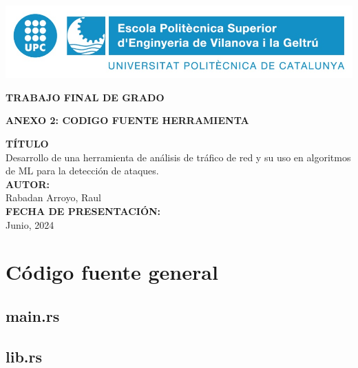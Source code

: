 \documentclass[11pt]{report}
\begin{document}
\nocite{*}



\begin{titlepage}
    \begin{center}
        \includegraphics{media/epsevg_logo.jpeg}

        \vspace{1.5cm}
        {\Huge\textbf{TRABAJO FINAL DE GRADO}}

        \vfill
        {\Large\textbf{ANEXO 2: CODIGO FUENTE HERRAMIENTA}}

        \vfill
        \textbf{TÍTULO} \\  	Desarrollo de una herramienta de análisis de tráfico de red y su uso en algoritmos de ML para la detección de ataques.
        \\[\baselineskip]
        \textbf{AUTOR:} \\ Rabadan Arroyo, Raul 
        \\[\baselineskip]
        \textbf{FECHA DE PRESENTACIÓN:} \\ Junio, 2024
        \vfill

    \end{center}
\end{titlepage}

\tableofcontents
\newpage

\chapter{Código fuente general}

\section{main.rs}


\section{lib.rs}

\end{document}
